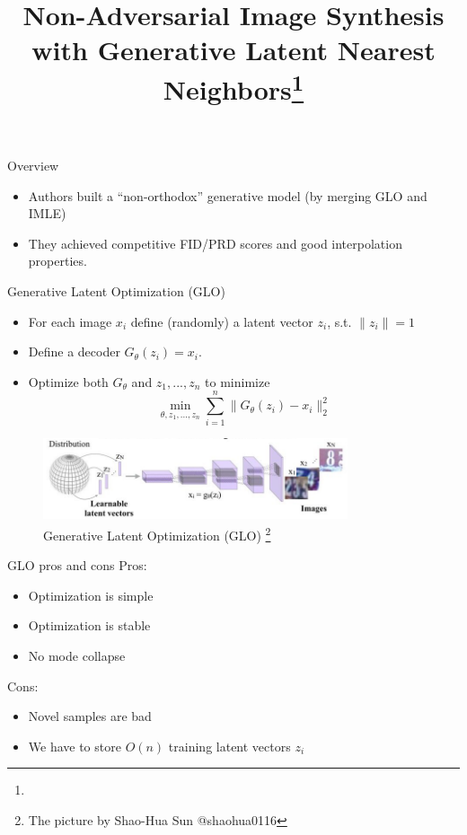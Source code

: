 \documentclass[10pt]{beamer}
\title{Non-Adversarial Image Synthesis with Generative Latent Nearest Neighbors\footnote{\citepaper{GLANN}}}
\begin{document}
\begin{frame}
    \titlepage
\end{frame}

\begin{frame}{Overview}
    \begin{itemize}
        \item\pause Authors built a ``non-orthodox'' generative model (by merging GLO and IMLE)
        \item\pause They achieved competitive FID/PRD scores and good interpolation properties.
    \end{itemize}
\end{frame}

\begin{frame}{Generative Latent Optimization (GLO)}
    \begin{itemize}
        \item For each image $x_i$ define (randomly) a latent vector $z_i$, s.t. $\| z_i \| = 1$
        \item Define a decoder $G_\theta(z_i) = x_i$.
        \item Optimize both $G_\theta$ and $z_1, ..., z_n$ to minimize
        \begin{equation*}
            \min_{\theta, z_1, ..., z_n} \sum_{i=1}^n \|G_\theta(z_i) - x_i \|_2^2
        \end{equation*}
    \end{itemize}
    
    \begin{figure}
        \centering
        \includegraphics[width=0.8\textwidth]{images/glo}
        \caption{Generative Latent Optimization (GLO) \footnote{The picture by Shao-Hua Sun @shaohua0116}}
    \end{figure}
\end{frame}

\begin{frame}{GLO pros and cons}
    Pros:
    \begin{itemize}
        \item\pause Optimization is simple
        \item\pause Optimization is stable
        \item\pause No mode collapse
    \end{itemize}
    
    Cons:
    \begin{itemize}
        \item\pause Novel samples are bad
        \item\pause We have to store $O(n)$ training latent vectors $z_i$
    \end{itemize}
\end{frame}
\end{document}
